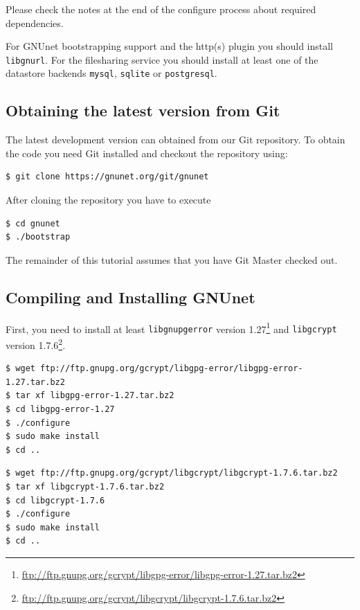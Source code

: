 \documentclass[10pt]{article}
\begin{document}
Please check the notes at the end of the configure process about required dependencies.

For GNUnet bootstrapping support and the http(s) plugin you should install \texttt{libgnurl}.
For the filesharing service you should install at least one of the datastore backends \texttt{mysql},
\texttt{sqlite} or \texttt{postgresql}.

\subsection{Obtaining the latest version from Git}

The latest development version can obtained from our Git repository. To obtain
the code you need Git installed and checkout the repository using:
\lstset{language=bash}
\begin{lstlisting}
$ git clone https://gnunet.org/git/gnunet
\end{lstlisting}
After cloning the repository you have to execute
\lstset{language=bash}
\begin{lstlisting}
$ cd gnunet
$ ./bootstrap
\end{lstlisting}

The remainder of this tutorial assumes that you have Git Master checked out.


\subsection{Compiling and Installing GNUnet}

First, you need to install at least {\tt libgnupgerror} version
1.27\footnote{\url{ftp://ftp.gnupg.org/gcrypt/libgpg-error/libgpg-error-1.27.tar.bz2}}
and {\tt libgcrypt} version
1.7.6\footnote{\url{ftp://ftp.gnupg.org/gcrypt/libgcrypt/libgcrypt-1.7.6.tar.bz2}}.

\lstset{language=bash}
\begin{lstlisting}
$ wget ftp://ftp.gnupg.org/gcrypt/libgpg-error/libgpg-error-1.27.tar.bz2
$ tar xf libgpg-error-1.27.tar.bz2
$ cd libgpg-error-1.27
$ ./configure
$ sudo make install
$ cd ..
\end{lstlisting}

\lstset{language=bash}
\begin{lstlisting}
$ wget ftp://ftp.gnupg.org/gcrypt/libgcrypt/libgcrypt-1.7.6.tar.bz2
$ tar xf libgcrypt-1.7.6.tar.bz2
$ cd libgcrypt-1.7.6
$ ./configure
$ sudo make install
$ cd ..
\end{lstlisting}
\end{document}

